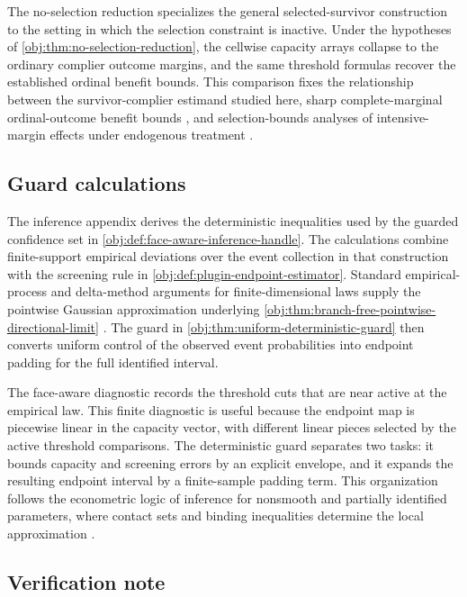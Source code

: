 The no-selection reduction specializes the general selected-survivor construction to the setting in which the selection constraint is inactive.  Under the hypotheses of \cref{obj:thm:no-selection-reduction}, the cellwise capacity arrays collapse to the ordinary complier outcome margins, and the same threshold formulas recover the established ordinal benefit bounds.  This comparison fixes the relationship between the survivor-complier estimand studied here, sharp complete-marginal ordinal-outcome benefit bounds \citep{LuDingDasgupta2018}, and selection-bounds analyses of intensive-margin effects under endogenous treatment \citep{DongHeiler2026}.

\subsection{Guard calculations}

The inference appendix derives the deterministic inequalities used by the guarded confidence set in \cref{obj:def:face-aware-inference-handle}.  The calculations combine finite-support empirical deviations over the event collection in that construction with the screening rule in \cref{obj:def:plugin-endpoint-estimator}.  Standard empirical-process and delta-method arguments for finite-dimensional laws supply the pointwise Gaussian approximation underlying \cref{obj:thm:branch-free-pointwise-directional-limit} \citep{vanDerVaart1998}.  The guard in \cref{obj:thm:uniform-deterministic-guard} then converts uniform control of the observed event probabilities into endpoint padding for the full identified interval.

The face-aware diagnostic records the threshold cuts that are near active at the empirical law.  This finite diagnostic is useful because the endpoint map is piecewise linear in the capacity vector, with different linear pieces selected by the active threshold comparisons.  The deterministic guard separates two tasks: it bounds capacity and screening errors by an explicit envelope, and it expands the resulting endpoint interval by a finite-sample padding term.  This organization follows the econometric logic of inference for nonsmooth and partially identified parameters, where contact sets and binding inequalities determine the local approximation \citep{FangSantos2019}.

\subsection{Verification note}

